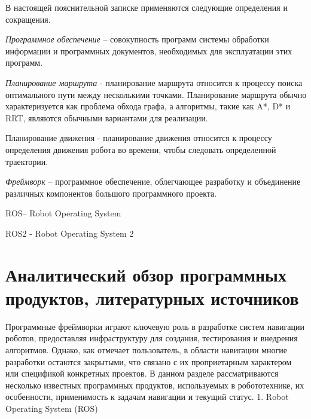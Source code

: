 



\newcommand{\appname}{ПСНМС} 
\newcommand{\ros}{ROS}


В настоящей пояснительной записке применяются следующие определения и
сокращения.

\textit{Программное обеспечение} -- совокупность программ системы обработки
информации и программных документов, необходимых для эксплуатации этих
программ.

\textit{Планирование маршрута} - планирование маршрута относится к процессу
поиска оптимального пути между несколькими точками. Планирование маршрута обычно
характеризуется как проблема обхода графа, а алгоритмы, такие как A*, D* и RRT,
являются обычными вариантами для реализации.

Планирование движения - планирование движения относится к процессу определения
движения робота во времени, чтобы следовать определенной траектории.

\textit{Фреймворк} -- программное обеспечение, облегчающее разработку и
объединение различных компонентов большого программного проекта.

\ros -- Robot Operating System

\ros2{} - Robot Operating System 2

\renewcommand \contentsname {\centerline{\bfseries\large{\MakeUppercase{содержание}}}}
\newpage

{
\tableofcontents
\newpage
}



	\section{Аналитический обзор программных продуктов, литературных источников}

Программные фреймворки играют ключевую роль в разработке систем навигации
роботов, предоставляя инфраструктуру для создания, тестирования и внедрения
алгоритмов. Однако, как отмечает пользователь, в области навигации многие
разработки остаются закрытыми, что связано с их проприетарным характером или
спецификой конкретных проектов. В данном разделе рассматриваются несколько
известных программных продуктов, используемых в робототехнике, их
особенности, применимость к задачам навигации и текущий статус. 1. Robot
Operating System (ROS)

